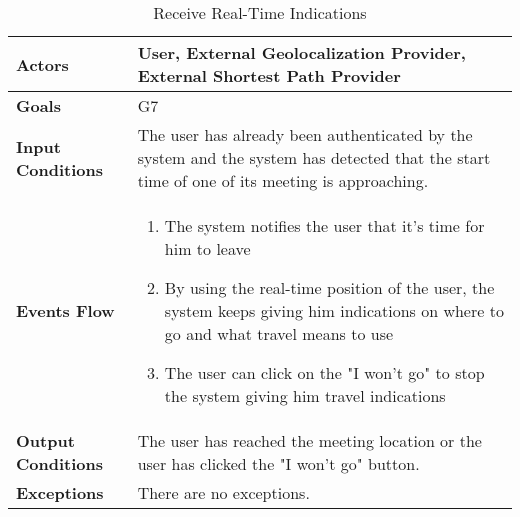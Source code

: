 \begin{table}[H]
	\centering
	\def\arraystretch{1.5}
	\begin{tabular}{|p{7cm}|p{7cm}|}
		\hline
		\textbf{Actors}            & User, External Geolocalization Provider, External Shortest Path Provider		    \\ \hline
		\textbf{Goals}             & G7           \\ \hline
		\textbf{Input Conditions}  & The user has already been authenticated by the system and the system has detected that the start time of one of its meeting is approaching.           \\ \hline
		\textbf{Events Flow}       & 
			\begin{enumerate}[topsep=0pt, leftmargin=*]
				\item The system notifies the user that it's time for him to leave
				\item By using the real-time position of the user, the system keeps giving him indications on where to go and what travel means to use
				\item The user can click on the "I won't go" to stop the system giving him travel indications
			\end{enumerate}	        \\ \hline
		\textbf{Output Conditions} & The user has reached the meeting location or the user has clicked the "I won't go" button.           \\ \hline
		\textbf{Exceptions}        & There are no exceptions.           \\ \hline
	\end{tabular}
	\caption{Receive Real-Time Indications}
\end{table}


